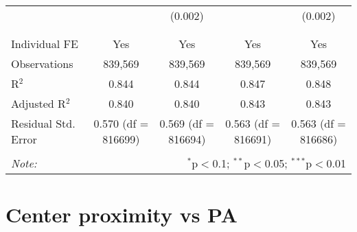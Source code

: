 \documentclass[
]{article}
\begin{document}
\begin{table}[!htbp]
{\begin{tabular}{@{\extracolsep{5pt}}lcccc}
  &  & (0.002) &  & (0.002) \\ 
  & & & & \\ 
\hline \\[-1.8ex] 
Individual FE & Yes & Yes & Yes & Yes \\ 
Observations & 839,569 & 839,569 & 839,569 & 839,569 \\ 
R$^{2}$ & 0.844 & 0.844 & 0.847 & 0.848 \\ 
Adjusted R$^{2}$ & 0.840 & 0.840 & 0.843 & 0.843 \\ 
Residual Std. Error & 0.570 (df = 816699) & 0.569 (df = 816694) & 0.563 (df = 816691) & 0.563 (df = 816686) \\ 
\hline 
\hline \\[-1.8ex] 
\textit{Note:}  & \multicolumn{4}{r}{$^{*}$p$<$0.1; $^{**}$p$<$0.05; $^{***}$p$<$0.01} \\ 
\end{tabular}
} 
\end{table} 
\newpage
\section{Center proximity vs PA}
\end{document}
